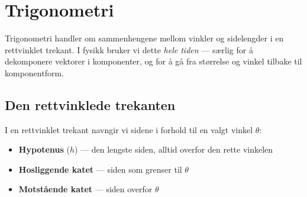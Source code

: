 \section{Trigonometri}

Trigonometri handler om sammenhengene mellom vinkler og sidelengder i en rettvinklet trekant. I fysikk bruker vi dette \textit{hele tiden} — særlig for å dekomponere vektorer i komponenter, og for å gå fra størrelse og vinkel tilbake til komponentform.

\subsection*{Den rettvinklede trekanten}

I en rettvinklet trekant navngir vi sidene i forhold til en valgt vinkel $\theta$:
\begin{itemize}
    \item \textbf{Hypotenus} ($h$) — den lengste siden, alltid overfor den rette vinkelen
    \item \textbf{Hosliggende katet} — siden som grenser til $\theta$
    \item \textbf{Motstående katet} — siden overfor $\theta$
\end{itemize}

